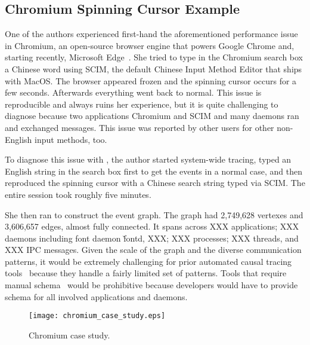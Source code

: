 \subsection{Chromium Spinning Cursor Example}


One of the authors experienced first-hand the aforementioned performance
issue in Chromium, an open-source browser engine that powers Google Chrome
and, starting recently, Microsoft Edge~\cite{xxx}.  She tried to type in
the Chromium search box a Chinese word using SCIM, the default Chinese
Input Method Editor that ships with MacOS.  The browser appeared frozen
and the spinning cursor occurs for a few seconds.  Afterwards everything
went back to normal.  This issue is reproducible and always ruins her
experience, but it is quite challenging to diagnose because two
applications Chromium and SCIM and many daemons ran and exchanged
messages.  This issue was reported by other users for other non-English
input methods, too.

To diagnose this issue with \xxx, the author started system-wide tracing,
typed an English string in the search box first to get the events in a
normal case, and then reproduced the spinning cursor with a Chinese search
string typed via SCIM.  The entire session took roughly five minutes.

She then ran \xxx to construct the event graph.  The graph had 2,749,628
vertexes and 3,606,657 edges, almost fully connected.  It spans across XXX
applications; XXX daemons including font daemon \v{fontd}, XXX; XXX
processes; XXX threads, and XXX IPC messages.  Given the scale of the
graph and the diverse communication patterns, it would be extremely
challenging for prior automated causal tracing tools~\cite{xxx} because
they handle a fairly limited set of patterns.  Tools that require manual
schema~\cite{xxx} would be prohibitive because developers would have to
provide schema for all involved applications and daemons.

\begin{figure*}[tb]
    \centering
    \texttt{[image: chromium\_case\_study.eps]}
    \caption{Chromium case study.}
    \label{fig:chromium-trace}
\end{figure*}

